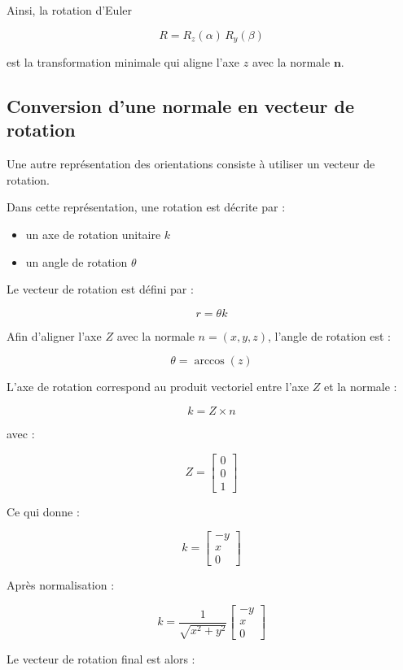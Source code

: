 \documentclass[a4paper,11pt]{article}
\begin{document}
Ainsi, la rotation d'Euler

\[
R = R_z(\alpha)\, R_y(\beta)
\]

est la transformation minimale qui aligne l'axe \(z\) avec la normale \(\mathbf{n}\).

\subsection{Conversion d'une normale en vecteur de rotation}

Une autre représentation des orientations consiste à utiliser un vecteur de rotation.

Dans cette représentation, une rotation est décrite par :

\begin{itemize}
\item un axe de rotation unitaire $k$
\item un angle de rotation $\theta$
\end{itemize}

Le vecteur de rotation est défini par :

\[
r = \theta k
\]

Afin d'aligner l'axe $Z$ avec la normale $n = (x,y,z)$, l'angle de rotation est :

\[
\theta = \arccos(z)
\]

L'axe de rotation correspond au produit vectoriel entre l'axe $Z$ et la normale :

\[
k = Z \times n
\]

avec :

\[
Z =
\begin{bmatrix}
0 \\
0 \\
1
\end{bmatrix}
\]

\newpage

Ce qui donne :

\[
k =
\begin{bmatrix}
-y \\
x \\
0
\end{bmatrix}
\]

Après normalisation :

\[
k =
\frac{1}{\sqrt{x^2+y^2}}
\begin{bmatrix}
-y \\
x \\
0
\end{bmatrix}
\]

Le vecteur de rotation final est alors :
\end{document}
